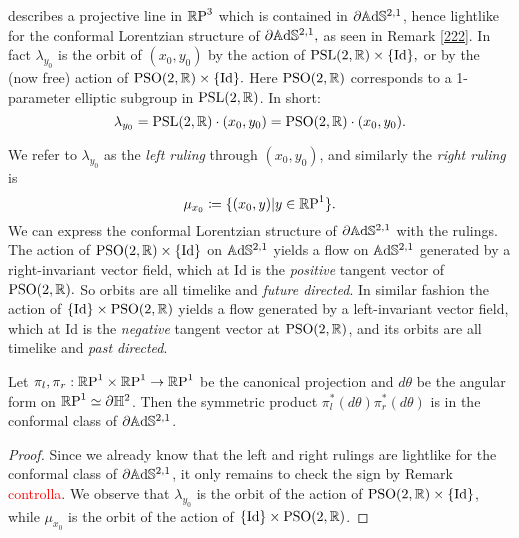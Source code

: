 describes a projective line in $\R\text{P}^3$ which is contained in $\partial\A^{2,1}$, hence lightlike for the conformal Lorentzian structure of $\partial\A^{2,1},$ as seen in Remark \ref{222}. In fact $\lambda_{y_0}$ is the orbit of $(x_0,y_0)$ by the action of $\PSL\times\{\text{Id}\},$ or by the (now free) action of $\text{PSO}(2,\R)\times\{\text{Id}\}.$ Here $\text{PSO}(2,\R)$ corresponds to a 1-parameter elliptic subgroup in $\PSL$. In short: 
\[
    \lambda_{y_0}=\PSL\cdot(x_0,y_0)=\text{PSO}(2,\R)\cdot(x_0,y_0).
\]

We refer to $\lambda_{y_0}$ as the \textit{left ruling} through $(x_0,y_0)$, and similarly the \textit{right ruling} is 
\[
    \mu_{x_0}\coloneqq\{(x_0,y)|y\in\R\text{P}^1\}.
\]
We can express the conformal Lorentzian structure of $\partial\A^{2,1}$ with the rulings. The action of $\text{PSO}(2,\R)\times\{\text{Id}\}$ on $\A^{2,1}$ yields a flow on $\A^{2,1}$ generated by a right-invariant vector field, which at Id is the \textit{positive } tangent vector of $\text{PSO}(2,\R).$ So orbits are all timelike and \textit{future directed}. In similar fashion the action of $\{\text{Id}\}\times\text{PSO}(2,\R)$ yields a flow generated by a left-invariant vector field, which at Id is the \textit{negative} tangent vector at $\text{PSO}(2,\R)$, and its orbits are all timelike and \textit{past directed}. 
\begin{proposition}
    Let $\pi_l,\pi_r:\S\times\S\to\S$ be the canonical projection and $d\theta$ be the angular form on $\S\simeq\partial\H^2$. Then the symmetric product $\pi_l^*(d\theta)\pi_r^*(d\theta)$ is in the conformal class of $\partial\A^{2,1}$.
\end{proposition}  
\begin{proof}
 Since we already know that the left and right rulings are lightlike for the conformal class of $\partial\A^{2,1}$, it only remains to check the sign by Remark \textcolor{red}{controlla}. We observe that $\lambda_{y_0}$ is the orbit of the action of $\text{PSO}(2,\R)\times\{\text{Id}\}$, while $\mu_{x_0}$ is the orbit of the action of $\{\text{Id}\}\times\text{PSO}(2,\R)$. 
\end{proof}

